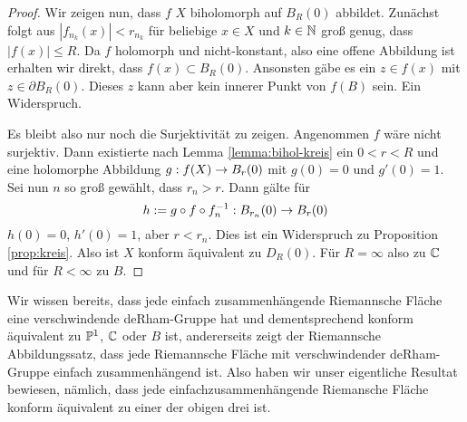 \begin{proof}
  Wir zeigen nun, dass $f$ $X$ biholomorph auf $B_R(0)$ abbildet.
  Zunächst folgt aus $|f_{n_k}(x)| < r_{n_k}$ für beliebige $x \in X$
  und $k \in \N$ groß genug, dass $|f(x)| \leq R$. Da $f$
  holomorph und nicht-konstant, also eine offene Abbildung ist erhalten wir direkt,
  dass $f(x) \subset B_R(0)$. Ansonsten gäbe es ein $z \in f(x)$ mit
  $z \in \partial B_R(0)$. Dieses $z$ kann aber kein innerer Punkt von
  $f(B)$ sein. Ein Widerspruch. 

  Es bleibt also nur noch die Surjektivität zu zeigen. 
  Angenommen $f$ wäre nicht surjektiv. Dann existierte nach Lemma
  \ref{lemma:bihol-kreis} ein $0 < r < R$ und eine holomorphe
  Abbildung $g: f(X) \ra B_r(0)$ mit $g(0) = 0$ und $g'(0) = 1$. 
  Sei nun $n$ so groß gewählt, dass $r_n > r$. Dann gälte für
  \[
  h:= g \circ f \circ f^{-1}_n : B_{r_n}(0) \ra B_r(0)
  \]
  $h(0)=0$, $h'(0) = 1$, aber $r < r_n$. Dies ist ein Widerspruch zu
  Proposition \ref{prop:kreis}. 
  Also ist $X$ konform äquivalent zu $D_R(0)$. Für $R = \infty$ also
  zu $\C$ und für $R < \infty$ zu $B$.
\end{proof}

\begin{rem}
  Wir wissen bereits, dass jede einfach zusammenhängende Riemannsche
  Fläche eine verschwindende deRham-Gruppe hat und dementsprechend
  konform äquivalent zu $\P^1$, $\C$ oder $B$ ist, andererseits zeigt
  der Riemannsche Abbildungssatz, dass jede Riemannsche Fläche mit
  verschwindender deRham-Gruppe einfach zusammenhängend ist. Also
  haben wir unser eigentliche Resultat bewiesen, nämlich, dass jede
  einfachzusammenhängende Riemansche Fläche konform äquivalent zu
  einer der obigen drei ist.
\end{rem}

